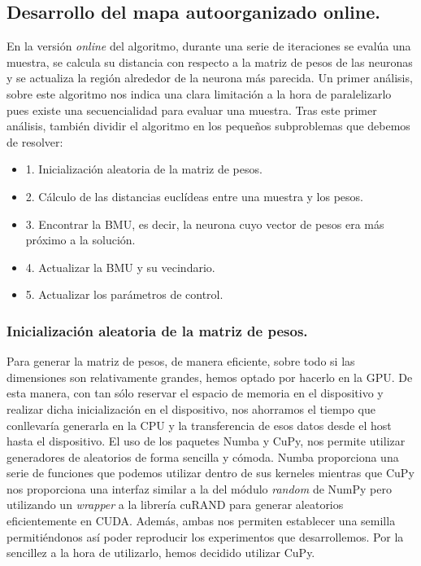 
\subsection{Desarrollo del mapa autoorganizado online.}
En la versión \textit{online} del algoritmo, durante una serie de iteraciones se evalúa una muestra, se calcula su distancia con respecto a la matriz de pesos de las neuronas y se actualiza la región alrededor de la neurona más parecida. Un primer análisis, sobre este algoritmo nos indica una clara limitación a la hora de paralelizarlo pues existe una secuencialidad para evaluar una muestra. Tras este primer análisis, también dividir el algoritmo en los pequeños subproblemas que debemos de resolver:

\begin{itemize}
  \item 1. Inicialización aleatoria de la matriz de pesos.
  \item 2. Cálculo de las distancias euclídeas entre una muestra y los pesos.
  \item 3. Encontrar la BMU, es decir, la neurona cuyo vector de pesos era más próximo a la solución.
  \item 4. Actualizar la BMU y su vecindario.
  \item 5. Actualizar los parámetros de control.
\end{itemize} 

\subsubsection{Inicialización aleatoria de la matriz de pesos.}

Para generar la matriz de pesos, de manera eficiente, sobre todo si las dimensiones son relativamente grandes, hemos optado por hacerlo en la GPU. De esta manera, con tan sólo reservar el espacio de memoria en el dispositivo y realizar dicha inicialización en el dispositivo, nos ahorramos el tiempo que conllevaría generarla en la CPU y la transferencia de esos datos desde el host hasta el dispositivo. El uso de los paquetes Numba y CuPy, nos permite utilizar generadores de aleatorios de forma sencilla y cómoda. Numba proporciona una serie de funciones que podemos utilizar dentro de sus kerneles mientras que CuPy nos proporciona una interfaz similar a la del módulo \textit{random} de NumPy pero utilizando un \textit{wrapper} a la librería cuRAND para generar aleatorios eficientemente en CUDA. Además, ambas nos permiten establecer una semilla permitiéndonos así poder reproducir los experimentos que desarrollemos. Por la sencillez a la hora de utilizarlo, hemos decidido utilizar CuPy.

